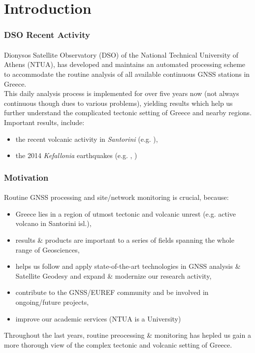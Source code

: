 \graphicspath{{Chapter1/Figs/}}

\section{Introduction}

\begin{frame}\frametitle{DSO Recent Activity}\framesubtitle{}
\vskip-1.5cm
  Dionysos Satellite Observatory (DSO) of the National Technical University of 
  Athens (NTUA), has developed and maintains an automated processing
  scheme to accommodate the routine analysis of all available continuous GNSS 
  stations in Greece.
  \\
  This daily analysis process is implemented for over five years now (not 
  always continuous though dues to various problems), yielding 
  results which help us further understand the complicated tectonic setting of 
  Greece and nearby regions.
  \\
  Important results, include:
  \begin{itemize}
    \item the recent volcanic activity in \emph{Santorini} (e.g. \cite{papoutsis}),
    \item the 2014 \emph{Kefallonia} earthquakes (e.g. \cite{sarkefalonia}, \cite{sakkas})
  \end{itemize}
\end{frame}
%
\begin{frame}\frametitle{Motivation}\framesubtitle{}
  Routine GNSS processing and site/network monitoring is crucial, because:
  \begin{itemize}
    \item Greece lies in a region of utmost tectonic and volcanic unrest (e.g. 
      active volcano in Santorini isl.),
    \item results \& products are important to a series of fields spanning 
      the whole range of Geosciences,
    \item helps us follow and apply state-of-the-art technologies in GNSS analysis 
      \& Satellite Geodesy and expand \& modernize our research activity,
    \item contribute to the GNSS/EUREF community and be involved in ongoing/future projects,
    \item improve our academic services (NTUA is a University)
  \end{itemize}
  Throughout the last years, routine preocessing \& monitoring has hepled us gain 
  a more thorough view of the complex tectonic and volcanic setting of Greece.
\end{frame}

